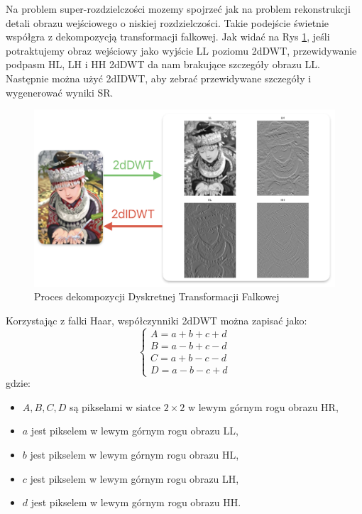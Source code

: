 Na problem super-rozdzielczości mozemy spojrzeć jak na problem rekonstrukcji detali obrazu wejściowego o niskiej rozdzielczości. Takie podejście świetnie współgra z dekompozycją transformacji falkowej. Jak widać na Rys \ref{fig:image48}, jeśli potraktujemy obraz wejściowy jako wyjście LL poziomu 2dDWT, przewidywanie podpasm HL, LH i HH 2dDWT da nam brakujące szczegóły obrazu LL. Następnie można użyć 2dIDWT, aby zebrać przewidywane szczegóły i wygenerować wyniki SR.


\begin{figure}[ht]
    \centering
    \begin{minipage}[t]{0.7\linewidth}
        \includegraphics[width=\linewidth]{Rozdziały/03.DWSR/Obrazy/konstrukcja_2dDWT.png}  
        \caption{Proces dekompozycji Dyskretnej Transformacji Falkowej}
        \label{fig:image48}
    \end{minipage}
\end{figure}


Korzystając z falki Haar, współczynniki 2dDWT można zapisać jako:
\begin{equation}
    \left\{\begin{array}{l}
    A=a+b+c+d \\
    B=a-b+c-d \\
    C=a+b-c-d \\
    D=a-b-c+d
    \end{array}\right.
\end{equation}
gdzie: 
\begin{itemize}
    \item $A, B, C, D$ są pikselami w siatce $2 \times  2$ w lewym górnym rogu obrazu HR,
    \item $a$ jest pikselem w lewym górnym rogu obrazu LL,
    \item $b$ jest pikselem w lewym górnym rogu obrazu HL,
    \item $c$ jest pikselem w lewym górnym rogu obrazu LH,
    \item $d$ jest pikselem w lewym górnym rogu obrazu HH.
\end{itemize}

